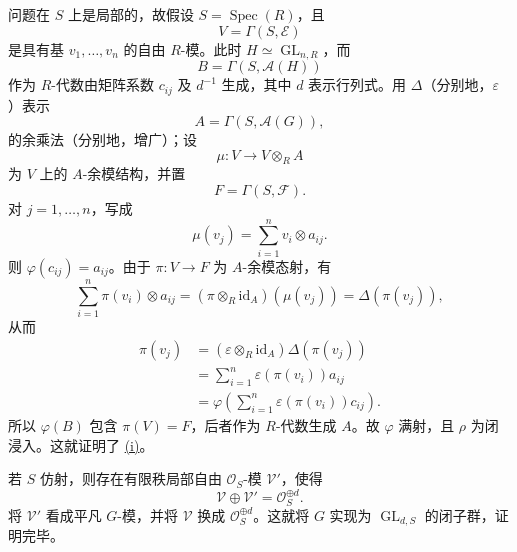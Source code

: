 问题在 \(S\) 上是局部的，故假设 \(S=\operatorname{Spec}(R)\)，且
\[
  V=\Gamma(S,\mathcal E)
\]
是具有基 \(v_1,\ldots,v_n\) 的自由 \(R\)-模。此时 \(H\simeq\operatorname{GL}_{n,R}\)，而
\[
  B=\Gamma(S,\mathcal A(H))
\]
作为 \(R\)-代数由矩阵系数 \(c_{ij}\) 及 \(d^{-1}\) 生成，其中 \(d\) 表示行列式。用 \(\Delta\)\textup{（分别地，\(\varepsilon\)）}表示
\[
  A=\Gamma(S,\mathcal A(G)),
\]
的余乘法\textup{（分别地，增广）}；设
\[
  \mu:V\longrightarrow V\otimes_R A
\]
为 \(V\) 上的 \(A\)-余模结构，并置
\[
  F=\Gamma(S,\mathcal F).
\]
对 \(j=1,\ldots,n\)，写成
\label{form:sga3-VIB-13.5-mu-matrix}%
\[
  \mu(v_j)=\sum_{i=1}^{n}v_i\otimes a_{ij}.
\]
则 \(\varphi(c_{ij})=a_{ij}\)。由于 \(\pi:V\to F\) 为 \(A\)-余模态射，有
\label{form:sga3-VIB-13.5-comodule-map}%
\[
  \sum_{i=1}^{n}\pi(v_i)\otimes a_{ij}
    =
  (\pi\otimes_R\mathrm{id}_A)(\mu(v_j))
    =
  \Delta(\pi(v_j)),
\]
从而
\label{form:sga3-VIB-13.5-coefficient-recovery}%
\[
  \begin{aligned}
  \pi(v_j)
    &=(\varepsilon\otimes_R\mathrm{id}_A)\Delta(\pi(v_j))\\
    &=\sum_{i=1}^{n}\varepsilon(\pi(v_i))a_{ij}\\
    &=\varphi\left(
        \sum_{i=1}^{n}\varepsilon(\pi(v_i))c_{ij}
      \right).
  \end{aligned}
\]
所以 \(\varphi(B)\) 包含 \(\pi(V)=F\)，后者作为 \(R\)-代数生成 \(A\)。故 \(\varphi\) 满射，且 \(\rho\) 为闭浸入。这就证明了 \hyperref[concl:sga3-VIB-13.5-i]{\textup{(i)}}。

若 \(S\) 仿射，则存在有限秩局部自由 \(\mathcal O_S\)-模 \(\mathcal V'\)，使得
\[
  \mathcal V\oplus\mathcal V'
    =\mathcal O_S^{\oplus d}.
\]
将 \(\mathcal V'\) 看成平凡 \(G\)-模，并将 \(\mathcal V\) 换成 \(\mathcal O_S^{\oplus d}\)。这就将 \(G\) 实现为 \(\operatorname{GL}_{d,S}\) 的闭子群，证明完毕。

